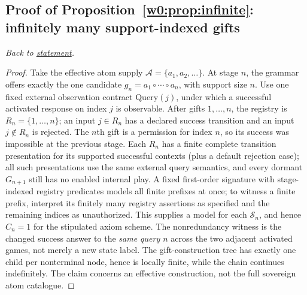 \documentclass[11pt,letterpaper]{article}
\theoremstyle{definition}\newtheorem{definition}[theorem]{Definition}\newtheorem{example}[theorem]{Example}
\theoremstyle{remark}\newtheorem{remark}[theorem]{Remark}
\newcommand{\Stage}{\mathcal{S}}
\newcommand{\Abs}{\mathcal{A}}
\begin{document}
\subsection{Proof of Proposition~\ref{w0:prop:infinite}: infinitely many support-indexed gifts}\label{w0:pr:infinite}
\textit{Back to \hyperref[w0:prop:infinite]{statement}.}
\begin{proof}
Take the effective atom supply $\Abs=\{a_1,a_2,\ldots\}$. At stage $n$, the grammar offers exactly the one candidate $g_n=a_1\circ\cdots\circ a_n$, with support size $n$. Use one fixed external observation contract $\mathrm{Query}(j)$, under which a successful activated response on index $j$ is observable. After gifts $1,\ldots,n$, the registry is $R_n=\{1,\ldots,n\}$; an input $j\in R_n$ has a declared success transition and an input $j\notin R_n$ is rejected. The $n$th gift is a permission for index $n$, so its success was impossible at the previous stage. Each $R_n$ has a finite complete transition presentation for its supported successful contexts (plus a default rejection case); all such presentations use the same external query semantics, and every dormant $G_{n+1}$ still has no enabled internal play. A fixed first-order signature with stage-indexed registry predicates models all finite prefixes at once; to witness a finite prefix, interpret its finitely many registry assertions as specified and the remaining indices as unauthorized. This supplies a model for each $\Stage_n$, and hence $C_n=1$ for the stipulated axiom scheme. The nonredundancy witness is the changed success answer to the \emph{same query $n$} across the two adjacent activated games, not merely a new state label. The gift-construction tree has exactly one child per nonterminal node, hence is locally finite, while the chain continues indefinitely. The claim concerns an effective construction, not the full sovereign atom catalogue.
\end{proof}
\end{document}
